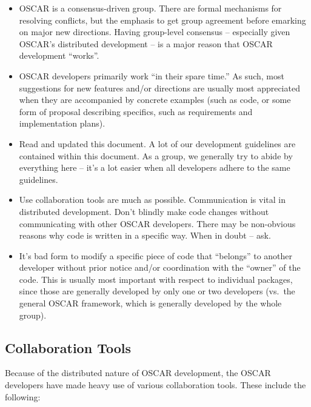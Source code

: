 \begin{itemize}
\item OSCAR is a consensus-driven group.  There are formal mechanisms
  for resolving conflicts, but the emphasis to get group agreement
  before emarking on major new directions.  Having group-level
  consensus -- especially given OSCAR's distributed development -- is
  a major reason that OSCAR development ``works''.
  
\item OSCAR developers primarily work ``in their spare time.''  As
  such, most suggestions for new features and/or directions are
  usually most appreciated when they are accompanied by concrete
  examples (such as code, or some form of proposal describing
  specifics, such as requirements and implementation plans).
  
\item Read and updated this document.  A lot of our development
  guidelines are contained within this document.  As a group, we
  generally try to abide by everything here -- it's a lot easier when
  all developers adhere to the same guidelines.
  
\item Use collaboration tools are much as possible.  Communication is
  vital in distributed development.  Don't blindly make code changes
  without communicating with other OSCAR developers.  There may be
  non-obvious reasons why code is written in a specific way.  When in
  doubt -- ask.
  
\item It's bad form to modify a specific piece of code that
  ``belongs'' to another developer without prior notice and/or
  coordination with the ``owner'' of the code.  This is usually most
  important with respect to individual packages, since those are
  generally developed by only one or two developers (vs.\ the general
  OSCAR framework, which is generally developed by the whole group).
\end{itemize}


\subsection{Collaboration Tools}

Because of the distributed nature of OSCAR development, the OSCAR
developers have made heavy use of various collaboration tools.  These
include the following:

